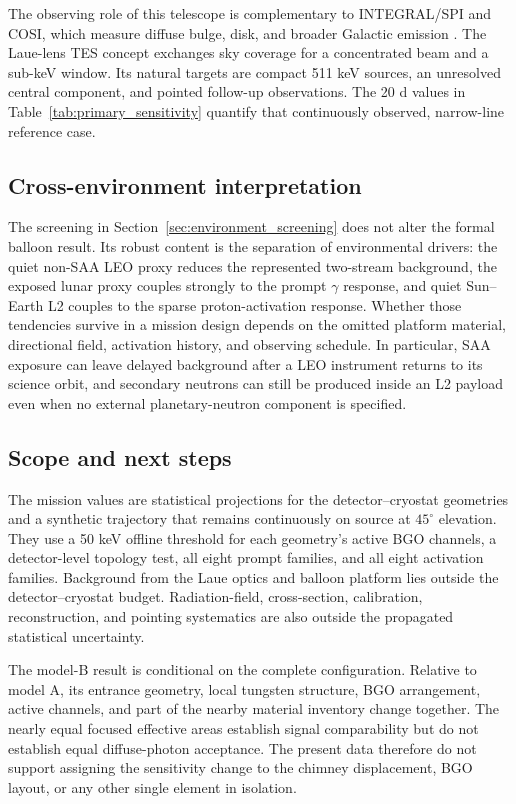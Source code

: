 \documentclass[11pt]{article}
\begin{document}
The observing role of this telescope is complementary to INTEGRAL/SPI and COSI,
which measure diffuse bulge, disk, and broader Galactic emission
\cite{Siegert2016AA,Kierans2020,Siegert2020COSI,Yoneda2025,Karwin2023}. The
Laue-lens TES concept exchanges sky coverage for a concentrated beam and a
sub-keV window. Its natural targets are compact 511 keV sources, an unresolved
central component, and pointed follow-up observations. The 20 d values in
Table~\ref{tab:primary_sensitivity} quantify that continuously observed,
narrow-line reference case.

\subsection{Cross-environment interpretation}

The screening in Section~\ref{sec:environment_screening} does not alter the
formal balloon result. Its robust content is the separation of environmental
drivers: the quiet non-SAA LEO proxy reduces the represented two-stream
background, the exposed lunar proxy couples strongly to the prompt
$\gamma$ response, and quiet Sun--Earth L2 couples to the sparse
proton-activation response. Whether those tendencies survive in a mission
design depends on the omitted platform material, directional field, activation
history, and observing schedule. In particular, SAA exposure can leave delayed
background after a LEO instrument returns to its science orbit, and secondary
neutrons can still be produced inside an L2 payload even when no external
planetary-neutron component is specified.

\subsection{Scope and next steps}
\label{subsec:limitations}

The mission values are statistical projections for the detector--cryostat
geometries and a synthetic trajectory that remains continuously on source at
$45^\circ$ elevation. They use a 50 keV offline threshold for each geometry's
active BGO channels, a detector-level topology test, all eight prompt families, and all eight
activation families. Background from the Laue optics and balloon platform lies
outside the detector--cryostat budget. Radiation-field, cross-section,
calibration, reconstruction, and pointing systematics are also outside the
propagated statistical uncertainty.

The model-B result is conditional on the complete configuration. Relative to
model A, its entrance geometry, local tungsten structure, BGO arrangement,
active channels, and part of the nearby material inventory change together.
The nearly equal focused effective areas establish signal comparability but do
not establish equal diffuse-photon acceptance. The present data therefore do
not support assigning the sensitivity change to the chimney displacement, BGO
layout, or any other single element in isolation.
\end{document}
